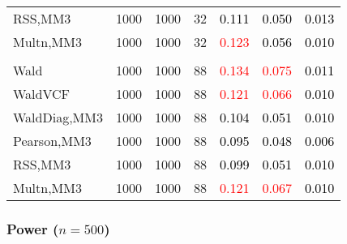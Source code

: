 \documentclass[
]{article}
\begin{document}
\begin{table}[H]
{\begin{tabular}[t]{lrrrrrr}
\hspace{1em}RSS,MM3 & 1000 & 1000 & 32 & \textcolor{black}{0.111} & \textcolor{black}{0.050} & \textcolor{black}{0.013}\\
\hspace{1em}Multn,MM3 & 1000 & 1000 & 32 & \textcolor{red}{0.123} & \textcolor{black}{0.056} & \textcolor{black}{0.010}\\
\addlinespace[0.3em]
\multicolumn{7}{l}{\textbf{3F 15V}}\\
\hspace{1em}Wald & 1000 & 1000 & 88 & \textcolor{red}{0.134} & \textcolor{red}{0.075} & \textcolor{black}{0.011}\\
\hspace{1em}WaldVCF & 1000 & 1000 & 88 & \textcolor{red}{0.121} & \textcolor{red}{0.066} & \textcolor{black}{0.010}\\
\hspace{1em}WaldDiag,MM3 & 1000 & 1000 & 88 & \textcolor{black}{0.104} & \textcolor{black}{0.051} & \textcolor{black}{0.010}\\
\hspace{1em}Pearson,MM3 & 1000 & 1000 & 88 & \textcolor{black}{0.095} & \textcolor{black}{0.048} & \textcolor{black}{0.006}\\
\hspace{1em}RSS,MM3 & 1000 & 1000 & 88 & \textcolor{black}{0.099} & \textcolor{black}{0.051} & \textcolor{black}{0.010}\\
\hspace{1em}Multn,MM3 & 1000 & 1000 & 88 & \textcolor{red}{0.121} & \textcolor{red}{0.067} & \textcolor{black}{0.010}\\
\bottomrule
\end{tabular}}
\endgroup{}
\end{table}

\subsubsection{\texorpdfstring{Power
(\(n=500\))}{Power (n=500)}}\label{power-n500-2}
\end{document}
